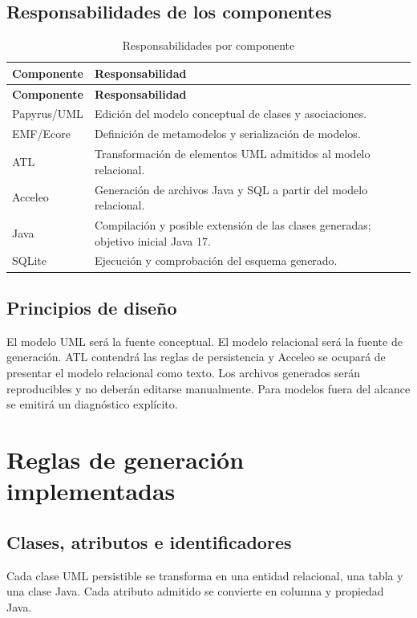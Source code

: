 \documentclass[12pt,a4paper,oneside]{report}
\begin{document}
\section{Responsabilidades de los componentes}
\begin{longtable}{p{}p{}}
\caption{Responsabilidades por componente}\label{tab:componentes}\\
\toprule
\textbf{Componente} & \textbf{Responsabilidad}\\
\midrule
\endfirsthead
\toprule
\textbf{Componente} & \textbf{Responsabilidad}\\
\midrule
\endhead
Papyrus/UML & Edición del modelo conceptual de clases y asociaciones.\\
EMF/Ecore & Definición de metamodelos y serialización de modelos.\\
ATL & Transformación de elementos UML admitidos al modelo relacional.\\
Acceleo & Generación de archivos Java y SQL a partir del modelo relacional.\\
Java & Compilación y posible extensión de las clases generadas; objetivo inicial Java 17.\\
SQLite & Ejecución y comprobación del esquema generado.\\
\bottomrule
\end{longtable}

\section{Principios de diseño}
El modelo UML será la fuente conceptual. El modelo relacional será la fuente de generación. ATL contendrá las reglas de persistencia y Acceleo se ocupará de presentar el modelo relacional como texto. Los archivos generados serán reproducibles y no deberán editarse manualmente. Para modelos fuera del alcance se emitirá un diagnóstico explícito.

\chapter{Reglas de generación implementadas}
\section{Clases, atributos e identificadores}
Cada clase UML persistible se transforma en una entidad relacional, una tabla y una clase Java. Cada atributo admitido se convierte en columna y propiedad Java.
\end{document}
